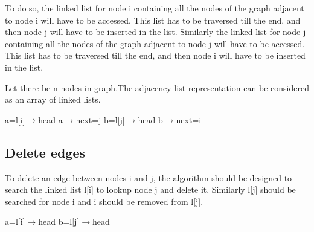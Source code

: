 \documentclass{article}
\begin{document}
To do so, the linked list for node i containing all the nodes of the graph adjacent to node i will have to be accessed. This list has to be traversed till the end, and then node j will have
to be inserted in the list. Similarly the linked list for node j containing all the nodes of the graph adjacent to node j will have to be accessed. This list has to be traversed till the end, 
and then node i will have to be inserted in the list.

Let there be n nodes in graph.The adjacency list representation can be considered as an array of linked lists.



\begin{algorithm}[H]
a=l[i]$\rightarrow$head\;
a$\rightarrow$next=j\;
b=l[j]$\rightarrow$head\;
b$\rightarrow$next=i\;
\end{algorithm}

\subsection*{Delete edges}

To delete an edge between nodes i and j, the algorithm should be designed to search the linked list l[i] to lookup node j and delete it. Similarly l[j] should be searched for node i and i should be
removed from l[j].


\begin{algorithm}[H]
a=l[i]$\rightarrow$head\;
b=l[j]$\rightarrow$head\;


\end{algorithm}
\end{document}

